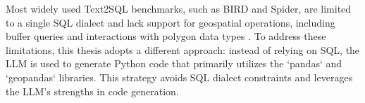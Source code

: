 Most widely used Text2SQL benchmarks, such as BIRD and Spider, are limited to a single SQL dialect and lack support for geospatial operations, including buffer queries and interactions with polygon data types \citep{Li2023BirdSQL, Yu2019Spider}. To address these limitations, this thesis adopts a different approach: instead of relying on SQL, the LLM is used to generate Python code that primarily utilizes the `pandas` and `geopandas` libraries. This strategy avoids SQL dialect constraints and leverages the LLM's strengths in code generation.






